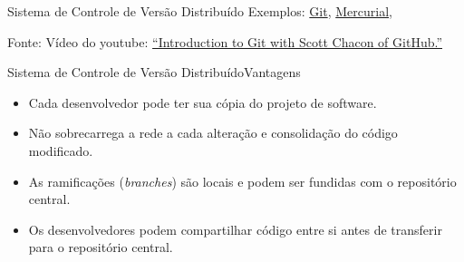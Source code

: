 \begin{frame}{Sistema de Controle de Versão Distribuído}
Exemplos: \href{http://gitscm.org/}{Git},
          \href{https://www.mercurial-scm.org/}{Mercurial},
          
\begin{center}
\end{center}
\tiny Fonte: Vídeo do youtube: \href{https://www.youtube.com/watch?v=ZDR433b0HJY}{``Introduction to Git with Scott Chacon of GitHub.''}
\end{frame}

\begin{frame}{Sistema de Controle de Versão Distribuído}{Vantagens}
\begin{itemize}[<+-| alert@+>]
\item Cada desenvolvedor pode ter sua cópia do projeto de software.
\item Não sobrecarrega a rede a cada alteração e consolidação do 
código modificado.
\item As ramificações ({\em branches}) são locais e podem ser 
 fundidas com o repositório central.
\item Os desenvolvedores podem compartilhar código entre si 
antes de transferir para o repositório central.
\end{itemize}
\end{frame}
